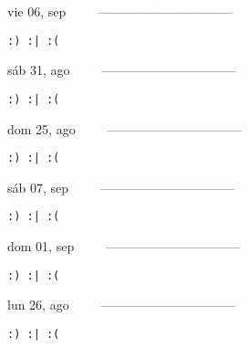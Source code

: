 \documentclass[letterpaper,10pt]{article}
\begin{document}
\begin{multicols}{3}
{vie 06, sep\ \ \ \ \ --------------------------------}
\begin{flushright}\begin{small}\texttt{:) :| :(}\end{small}\end{flushright}
\vfill
{sáb 31, ago\ \ \ \ \ --------------------------------}
\begin{flushright}\begin{small}\texttt{:) :| :(}\end{small}\end{flushright}\par
\vfill
{dom 25, ago\ \ \ \ \ --------------------------------}
\begin{flushright}\begin{small}\texttt{:) :| :(}\end{small}\end{flushright}\par
\vfill
\end{multicols}
\vspace{1.05cm}

\begin{multicols}{3}
{sáb 07, sep\ \ \ \ \ --------------------------------}
\begin{flushright}\begin{small}\texttt{:) :| :(}\end{small}\end{flushright}
\vfill
{dom 01, sep\ \ \ \ \ --------------------------------}
\begin{flushright}\begin{small}\texttt{:) :| :(}\end{small}\end{flushright}\par
\vfill
{lun 26, ago\ \ \ \ \ --------------------------------}
\begin{flushright}\begin{small}\texttt{:) :| :(}\end{small}\end{flushright}\par
\vfill
\end{multicols}
\vspace{1.05cm}
\end{document}
